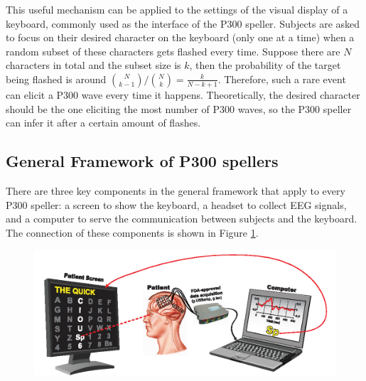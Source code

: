 \documentclass{article}
\begin{document}
\vspace{-3mm}
This useful mechanism can be applied to the settings of the visual display of a keyboard, commonly used as the interface of the P300 speller. Subjects are asked to focus on their desired character on the keyboard (only one at a time) when a random subset of these characters gets flashed every time. Suppose there are $N$ characters in total and the subset size is $k$, then the probability of the target being flashed is around ${N \choose k-1} / {N \choose k} = \frac{k}{N-k+1}$. Therefore, such a rare event can elicit a P300 wave every time it happens. Theoretically, the desired character should be the one eliciting the most number of P300 waves, so the P300 speller can infer it after a certain amount of flashes.

\subsection{General Framework of P300 spellers} \label{Framework}
There are three key components in the general framework that apply to every P300 speller: a screen to show the keyboard, a headset to collect EEG signals, and a computer to serve the communication between subjects and the keyboard. The connection of these components is shown in Figure \ref{fig:2}.

\vspace{-3mm}
\begin{figure}[H]
	\centering
	\includegraphics[width=0.7\linewidth]{overview.png}
	\label{fig:2}
\end{figure}
\end{document}
